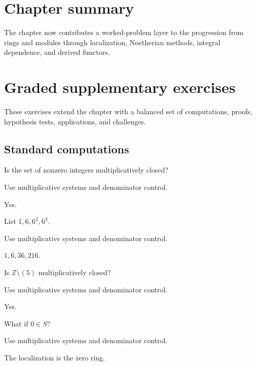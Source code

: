 \section*{Chapter summary}
The chapter now contributes a worked-problem layer to the progression from rings and modules through localization, Noetherian methods, integral dependence, and derived functors.
\section{Graded supplementary exercises}
These exercises extend the chapter with a balanced set of computations, proofs, hypothesis tests, applications, and challenges.

\subsection*{Standard computations}

\begin{exercise}[Closure]\label{exr:v05-expand-01}
Is the set of nonzero integers multiplicatively closed?
\end{exercise}
\begin{hint}
Use multiplicative systems and denominator control.
\end{hint}
\begin{solution}
Yes.
\end{solution}

\begin{exercise}\label{exr:v05-expand-02}
List $1,6,6^2,6^3$.
\end{exercise}
\begin{hint}
Use multiplicative systems and denominator control.
\end{hint}
\begin{solution}
$1,6,36,216$.
\end{solution}

\begin{exercise}\label{exr:v05-expand-03}
Is $\mathbb Z\setminus(5)$ multiplicatively closed?
\end{exercise}
\begin{hint}
Use multiplicative systems and denominator control.
\end{hint}
\begin{solution}
Yes.
\end{solution}

\begin{exercise}\label{exr:v05-expand-04}
What if $0\in S$?
\end{exercise}
\begin{hint}
Use multiplicative systems and denominator control.
\end{hint}
\begin{solution}
The localization is the zero ring.
\end{solution}

